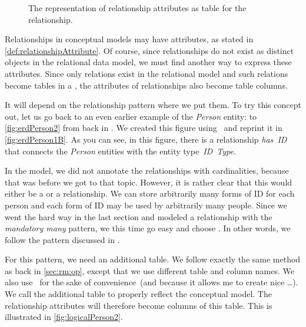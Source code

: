 %
%
\begin{figure}%
\centering%
%
%
%
\floatRowSep%
%
%
%
\caption{The representation of relationship attributes as table for the relationship.}%
\label{fig:logicalPerson2X}%
\end{figure}%
%
Relationships in conceptual models may have attributes, as stated in \cref{def:relationshipAttribute}.
Of course, since relationships do not exist as distinct objects in the relational data model, we must find another way to express these attributes.
Since only relations exist in the relational model and such relations become tables in a \db, the attributes of relationships also become table columns.

It will depend on the relationship pattern where we put them.
To try this concept out, let us go back to an even earlier example of the \emph{Person} entity:
to \cref{fig:erdPerson2} from back in .
We created this figure using \yEd\ and reprint it in \cref{fig:erdPerson1B}.
As you can see, in this figure, there is a relationship \emph{has~ID} that connects the \emph{Person} entities with the entity type~\emph{ID~Type}.

In the model, we did not annotate the relationships with cardinalities, because that was before we got to that topic.
However, it is rather clear that this would either be a  or a  relationship.
We can store arbitrarily many forms of ID for each person and each form of ID may be used by arbitrarily many people.
Since we went the hard way in the last section and modeled a relationship with the \emph{mandatory many} pattern, we this time go easy and choose .
In other words, we follow the pattern  discussed in .

For this pattern, we need an additional table.
We follow exactly the same method as back in \cref{sec:rm:op}, except that we use different table and column names.
We also use \pgmodeler\ for the sake of convenience~(and because it allows me to create nice \dots).
We call the additional table  to properly reflect the conceptual model.
The relationship attributes will therefore become columns of this table.
This is illustrated in \cref{fig:logicalPerson2}.

